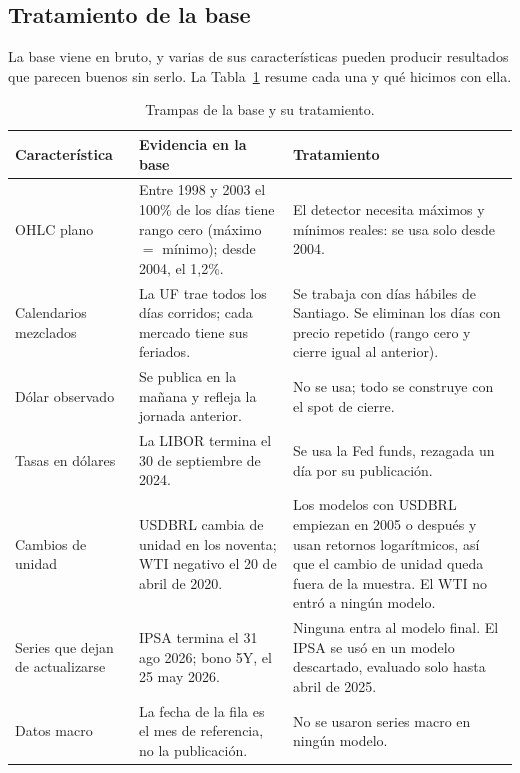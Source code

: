 \documentclass[10pt,a4paper]{article}
\begin{document}
\subsection{Tratamiento de la base}

La base viene en bruto, y varias de sus características pueden producir resultados que
parecen buenos sin serlo. La Tabla~\ref{tab:trampas} resume cada una y qué hicimos con
ella.

\begin{table}[htb]\centering\small
\renewcommand{\arraystretch}{1.1}
\begin{tabularx}{\textwidth}{@{}>{\raggedright\arraybackslash}p{3.1cm}XX@{}}
\toprule
Característica & Evidencia en la base & Tratamiento \\
\midrule
OHLC plano & Entre 1998 y 2003 el 100\% de los días tiene rango cero
  (máximo $=$ mínimo); desde 2004, el 1,2\%. & El detector necesita máximos
  y mínimos reales: se usa solo desde 2004. \\
\addlinespace
Calendarios mezclados & La UF trae todos los días corridos; cada mercado tiene
  sus feriados. & Se trabaja con días hábiles de Santiago. Se eliminan los días
  con precio repetido (rango cero y cierre igual al anterior). \\
\addlinespace
Dólar observado & Se publica en la mañana y refleja la jornada anterior. & No se
  usa; todo se construye con el spot de cierre. \\
\addlinespace
Tasas en dólares & La LIBOR termina el 30 de septiembre de 2024. & Se usa la Fed
  funds, rezagada un día por su publicación. \\
\addlinespace
Cambios de unidad & USDBRL cambia de unidad en los noventa; WTI negativo el 20
  de abril de 2020. & Los modelos con USDBRL empiezan en 2005 o después y usan
  retornos logarítmicos, así que el cambio de unidad queda fuera de la muestra. El
  WTI no entró a ningún modelo. \\
\addlinespace
Series que dejan de actualizarse & IPSA termina el 31 ago 2026; bono 5Y, el 25
  may 2026. & Ninguna entra al modelo final. El IPSA se usó en un modelo
  descartado, evaluado solo hasta abril de 2025. \\
\addlinespace
Datos macro & La fecha de la fila es el mes de referencia, no la publicación. & No
  se usaron series macro en ningún modelo. \\
\bottomrule
\end{tabularx}
\caption{Trampas de la base y su tratamiento.}\label{tab:trampas}
\end{table}
\end{document}
